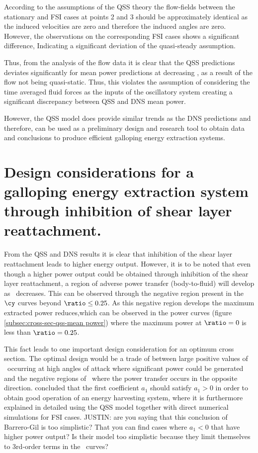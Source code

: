 According to the assumptions of the QSS theory the flow-fields between the stationary and FSI cases at points 2 and 3 should be approximately identical as the induced velocities are zero and therefore the induced angles are zero. However, the observations on the corresponding FSI cases shows a significant difference, Indicating a significant deviation of the quasi-steady assumption.

Thus, from the analysis of the flow data it is clear that the  QSS predictions deviates significantly for mean power predictions at decreasing \ratio, as a result of the flow not being quasi-static. Thus, this violates the assumption of considering the time averaged fluid forces as the inputs of the oscillatory system creating a significant discrepancy between QSS and DNS mean power.    

 However, the QSS model does provide similar trends as the DNS predictions and therefore, can be used as a preliminary design and research tool to obtain data and conclusions to produce efficient galloping energy extraction systems. 
  
 \section{Design considerations for a galloping energy extraction system through inhibition of shear layer reattachment.}
 \label{subsec:design-considerations-cross-section}
 
 From the QSS and DNS results it is clear that inhibition of the shear layer reattachment  leads to higher energy output. However, it is to be noted that even though a higher power output could be obtained through inhibition of the shear layer reattachment, a region of adverse power transfer (body-to-fluid)  will develop as \ratio\ decreases. This can be observed through the negative region present in the $\cy$ curves beyond $\ratio\leq0.25$. As this negative region develops the maximum extracted power reduces,which can be observed in the power curves (figure \ref{subsec:cross-sec-qss-mean power}) where the maximum power at $\ratio=0$ is less than $\ratio=0.25$.
 
 This fact leads to one important design consideration for an optimum cross section. The optimal design would be a trade of between large positive values of \cy\ occurring at high angles of attack where significant power could be generated and the negative regions of \cy\ where the power transfer occurs in the opposite direction. \citet{Barrero-Gil2010a} concluded that the first coefficient $a_1$ should satisfy  $a_1>0$ in order to obtain good operation of an energy harvesting system, where it is furthermore explained in detailed using the QSS model together with direct numerical simulations for FSI cases. JUSTIN: are you saying that this conclusion of Barrero-Gil is too simplistic? That you can find cases where $a_1 < 0$ that have higher power output? Is their model too simplistic because they limit themselves to 3rd-order terms in the \cy\ curves?

